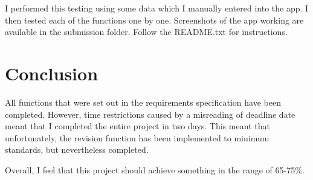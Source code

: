 \documentclass[11pt]{article}
\begin{document}
I performed this testing using some data which I manually entered into the app. I then tested each of the functions one by one. Screenshots of the app working are available in the submission folder. Follow the README.txt for instructions.

\section{Conclusion}
All functions that were set out in the requirements specification have been completed. However, time restrictions caused by a misreading of deadline date meant that I completed the entire project in two days. This meant that unfortunately, the revision function has been implemented to minimum standards, but nevertheless completed.

Overall, I feel that this project should achieve something in the range of 65-75\%.
\end{document}
